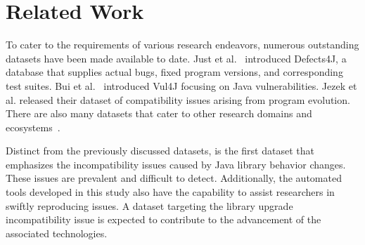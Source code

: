 \section{Related Work}\label{sec:related-compsuite}

To cater to the requirements of various research endeavors, numerous outstanding datasets have been
made available to date. Just et al.~\cite{just2014defects4j} introduced Defects4J, a database that
supplies actual bugs, fixed program versions, and corresponding test suites. Bui et
al.~\cite{bui2022vul4j} introduced Vul4J focusing on Java vulnerabilities. Jezek et al.
\cite{jezek2017api} released their dataset of compatibility issues arising from program evolution.
There are also many datasets that cater to other research domains and
ecosystems~\cite{zhu2017dataset,wei2016taming,nielebock2021androidcompass}. 


Distinct from the previously discussed datasets, \toolcompsuite is the first dataset that emphasizes the
incompatibility issues caused by Java library behavior changes. These issues are prevalent
and difficult to detect. Additionally, the automated tools developed in this study also have the capability to assist researchers in swiftly reproducing issues. A dataset targeting the library upgrade incompatibility
issue is expected to contribute to the advancement of the associated technologies.